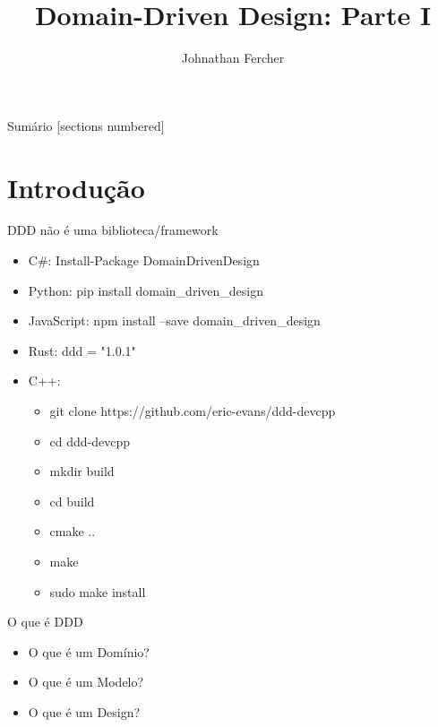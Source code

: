 \documentclass[aspectratio=169]{beamer}
\title{Domain-Driven Design: Parte I}
\date{}
\author{Johnathan Fercher}
\begin{document}
\maketitle

\begin{frame}{Sumário}
  [sections numbered]
  \tableofcontents[hideallsubsections]
\end{frame}

\section{Introdução}
\begin{frame}{DDD não é uma biblioteca/framework}	
	\begin{itemize}	
		\item C\#: Install-Package DomainDrivenDesign
		\item Python: pip install domain\_driven\_design
		\item JavaScript: npm install --save domain\_driven\_design
		\item Rust: ddd = "1.0.1"
		\item C++: 
		\begin{itemize}	
			\item git clone https://github.com/eric-evans/ddd-devcpp
			\item cd ddd-devcpp
			\item mkdir build
			\item cd build
			\item cmake ..
			\item make
			\item sudo make install
		\end{itemize}
	\end{itemize}
\end{frame}

\begin{frame}{O que é DDD}	
	\begin{itemize}	
		\item O que é um Domínio?
		\item O que é um Modelo?
		\item O que é um Design?
	\end{itemize}
\end{frame}
\end{document}
